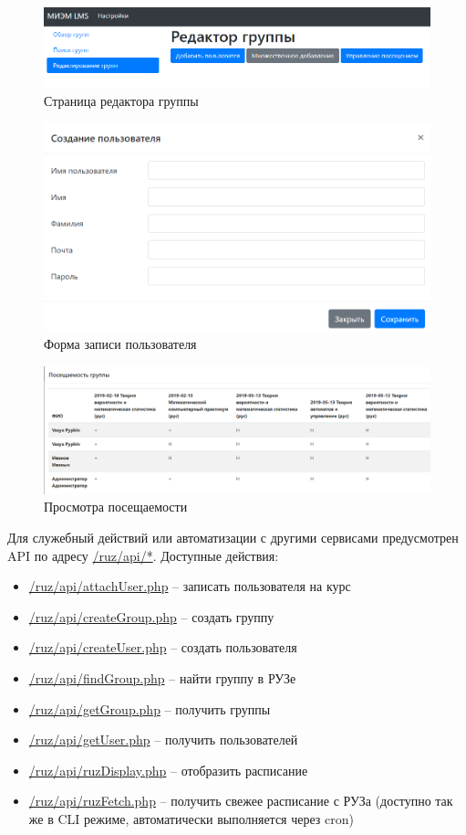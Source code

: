 \documentclass[a4paper,14pt]{article}
\begin{document}
\begin{figure}[H]
	\centering
	\includegraphics[width=\linewidth]{image/ui_groupEditor}
	\caption{Страница редактора группы }
	\label{img:ui_groupEditor}
\end{figure}
\begin{figure}[H]
	\centering
	\includegraphics[width=\linewidth]{image/ui_newUser}
	\caption{Форма записи пользователя}
	\label{img:ui_newUser}
\end{figure}
\begin{figure}[H]
	\centering
	\includegraphics[width=\linewidth]{image/ui_visits}
	\caption{Просмотра посещаемости}
	\label{img:ui_visits}
\end{figure}

Для служебный действий или автоматизации с другими сервисами предусмотрен API по адресу \url{/ruz/api/*}.
Доступные действия:
\begin{itemize}
	\item \url{/ruz/api/attachUser.php} -- записать пользователя на курс
	\item \url{/ruz/api/createGroup.php} -- создать группу
	\item \url{/ruz/api/createUser.php} -- создать пользователя
	\item \url{/ruz/api/findGroup.php} -- найти группу в РУЗе
	\item \url{/ruz/api/getGroup.php} -- получить группы
	\item \url{/ruz/api/getUser.php} -- получить пользователей
	\item \url{/ruz/api/ruzDisplay.php} -- отобразить расписание 
	\item \url{/ruz/api/ruzFetch.php} -- получить свежее расписание с РУЗа (доступно так же в CLI режиме, автоматически выполняется через cron)
\end{itemize}
\end{document}
